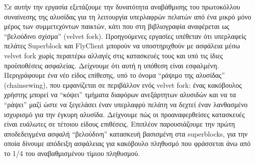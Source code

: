 Σε αυτήν την εργασία εξετάζουμε την δυνατότητα αναβάθμισης του πρωτοκόλλου συναίνεσης της αλυσίδας για τη λειτουργία υπερλαφρών πελατών από ένα μικρό μόνο μέρος των συμμετεχόντων παικτών, κάτι που στη βιβλιογραφία αναφέρεται ως ``βελούδινο σχίσμα'' (velvet fork). Προηγούμενες εργασίες υπέθεταν ότι υπερλαφείς πελάτες Superblock και FlyClient μπορούν να υποστηριχθούν με ασφάλεια μέσω velvet fork χωρίς περαιτέρω αλλαγές στις κατασκευές τους και υπό τις ίδιες προϋποθέσεις ασφαλείας. Δείχνουμε ότι αυτή η υπόθεση είναι εσφαλμένη. Περιγράφουμε ένα νέο είδος επίθεσης, υπό το όνομα ``ράψιμο της αλυσίδας'' (chainsewing), που εμφανίζεται σε περιβάλλον ενός velvet fork: ένας κακόβουλος χρήστης μπορεί να ``κόψει'' τμήματα διαφόρων ανεξάρτητων αλυσιδών και να τα ``ράψει'' μαζί ώστε να ξεγελάσει έναν υπερλαφρύ πελάτη να δεχτεί έναν λανθασμένο ισχυρισμό για την έγκυρη αλυσίδα. Δείχνουμε πώς οι προαναφερθείσες κατασκευές είναι ευάλωτες σε τέτοιου είδους επιθέσεις. Επιπλέον παρουσιάζουμε την πρώτη αποδεδειγμένα ασφαλή ``βελούδινη'' κατασκευή βασισμένη στα superblocks, για την οποία δίνουμε απόδειξη ασφάλειας για κακόβουλο πληθυσμό που φράσσεται άνω από το 1/4 του αναβαθμισμένου τίμιου πληθυσμού.

\newpage